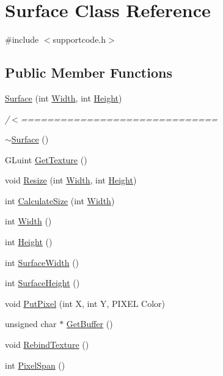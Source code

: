 \hypertarget{class_surface}{}\section{Surface Class Reference}
\label{class_surface}


{\ttfamily \#include $<$supportcode.\+h$>$}

\subsection*{Public Member Functions}
\begin{DoxyCompactItemize}
\item 
\hyperlink{class_surface_a323ba9165c8635e84eb0c490fe88d846}{Surface} (int \hyperlink{class_surface_ae76d7c2fa208df6979a77cc60e8105c0}{Width}, int \hyperlink{class_surface_ab901f48d51b3fd427415b580dc15518c}{Height})
\begin{DoxyCompactList}\small\item\em /$<$============================== \end{DoxyCompactList}\item 
\hyperlink{class_surface_a89de75c95cb550d432f3ea4ed1429db0}{$\sim$\+Surface} ()
\item 
G\+Luint \hyperlink{class_surface_a2cd8789d26457187b8af4be8c178e9d4}{Get\+Texture} ()
\item 
void \hyperlink{class_surface_a5e45e936e3057fa1ddad0c7924767005}{Resize} (int \hyperlink{class_surface_ae76d7c2fa208df6979a77cc60e8105c0}{Width}, int \hyperlink{class_surface_ab901f48d51b3fd427415b580dc15518c}{Height})
\item 
int \hyperlink{class_surface_aeb8a8540f415a4d29c440667e8532e91}{Calculate\+Size} (int \hyperlink{class_surface_ae76d7c2fa208df6979a77cc60e8105c0}{Width})
\item 
int \hyperlink{class_surface_ae76d7c2fa208df6979a77cc60e8105c0}{Width} ()
\item 
int \hyperlink{class_surface_ab901f48d51b3fd427415b580dc15518c}{Height} ()
\item 
int \hyperlink{class_surface_a4cbf23ea0c8ff533271109fc2a1a863d}{Surface\+Width} ()
\item 
int \hyperlink{class_surface_a377c59f6ef131d4b879cda93578a3efa}{Surface\+Height} ()
\item 
void \hyperlink{class_surface_a728571d0386e9690ce1760931562c72b}{Put\+Pixel} (int X, int Y, P\+I\+X\+EL Color)
\item 
unsigned char $\ast$ \hyperlink{class_surface_a8f8da8f3ee82b8e657916f40b3f40eff}{Get\+Buffer} ()
\item 
void \hyperlink{class_surface_aa75c49f53fec5c49ba8422c0d64815e6}{Rebind\+Texture} ()
\item 
int \hyperlink{class_surface_abe0d542404575c60911d6ad4219560f9}{Pixel\+Span} ()
\end{DoxyCompactItemize}


